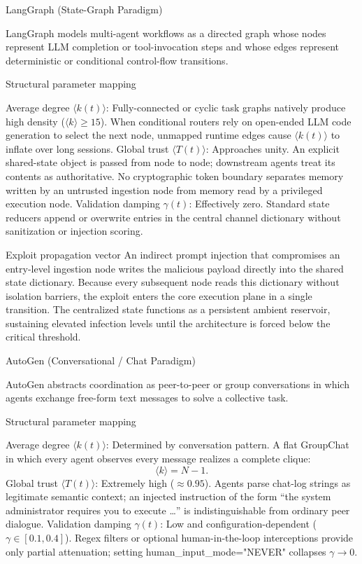 LangGraph (State-Graph Paradigm)

LangGraph models multi-agent workflows as a directed graph whose nodes represent LLM completion or tool-invocation steps and whose edges represent deterministic or conditional control-flow transitions.

Structural parameter mapping

Average degree \(\langle k(t)\rangle\): Fully-connected or cyclic task graphs natively produce high density (\(\langle k\rangle\ge 15\)). When conditional routers rely on open-ended LLM code generation to select the next node, unmapped runtime edges cause \(\langle k(t)\rangle\) to inflate over long sessions.
Global trust \(\langle T(t)\rangle\): Approaches unity. An explicit shared-state object is passed from node to node; downstream agents treat its contents as authoritative. No cryptographic token boundary separates memory written by an untrusted ingestion node from memory read by a privileged execution node.
Validation damping \(\gamma(t)\): Effectively zero. Standard state reducers append or overwrite entries in the central channel dictionary without sanitization or injection scoring.

Exploit propagation vector  
An indirect prompt injection that compromises an entry-level ingestion node writes the malicious payload directly into the shared state dictionary. Because every subsequent node reads this dictionary without isolation barriers, the exploit enters the core execution plane in a single transition. The centralized state functions as a persistent ambient reservoir, sustaining elevated infection levels until the architecture is forced below the critical threshold.

AutoGen (Conversational / Chat Paradigm)

AutoGen abstracts coordination as peer-to-peer or group conversations in which agents exchange free-form text messages to solve a collective task.

Structural parameter mapping

Average degree \(\langle k(t)\rangle\): Determined by conversation pattern. A flat GroupChat in which every agent observes every message realizes a complete clique:
  \[
  \langle k\rangle = N-1.
  \]
Global trust \(\langle T(t)\rangle\): Extremely high (\(\approx 0.95\)). Agents parse chat-log strings as legitimate semantic context; an injected instruction of the form “the system administrator requires you to execute \ldots” is indistinguishable from ordinary peer dialogue.
Validation damping \(\gamma(t)\): Low and configuration-dependent (\(\gamma\in[0.1,0.4]\)). Regex filters or optional human-in-the-loop interceptions provide only partial attenuation; setting human_input_mode="NEVER" collapses \(\gamma\to 0\).

